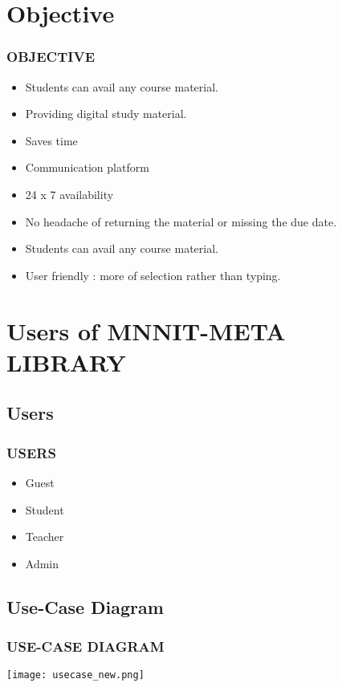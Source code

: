 \documentclass{beamer}
\begin{document}
\section{Objective}
\begin{frame}\frametitle{OBJECTIVE}
\begin{block}{}
	\begin{itemize}
		\item \textrm Students can avail any course material.
		\item \textrm Providing  digital study material.
		\item \textrm Saves time
		\item \textrm Communication platform
       \item \textrm 24 x 7  availability
      \item \textrm No headache of returning the material or missing the due date.
		\item \textrm Students can avail any course material.
		\item \textrm User friendly : more of selection rather than typing.
	\end{itemize}
\end{block}
\end{frame}

\section{Users of MNNIT-META LIBRARY}
\subsection{Users}
\begin{frame}\frametitle{USERS}
\begin{block}{}
	\begin{itemize}
		\item Guest
		\item Student
		\item Teacher
		\item Admin
	\end{itemize}
\end{block}
\end{frame}


\subsection{Use-Case Diagram}
\begin{frame}\frametitle{USE-CASE DIAGRAM}
		\texttt{[image: usecase\_new.png]}
\end{frame}
\end{document}
